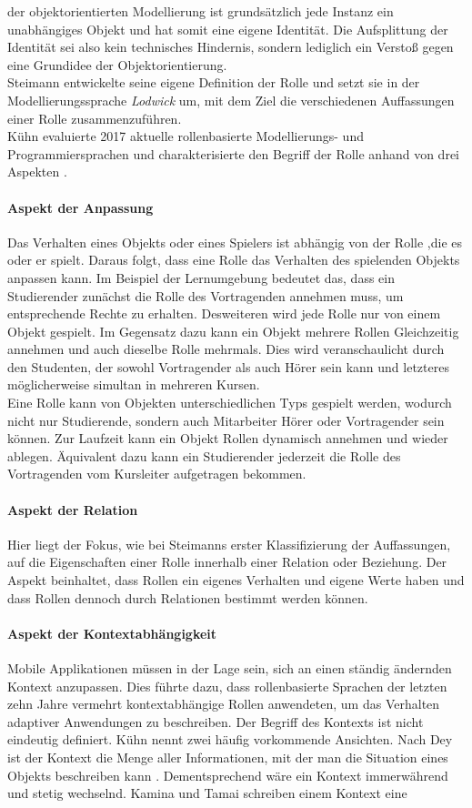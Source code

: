 \documentclass[conference]{IEEEtran}
\begin{document}
der objektorientierten Modellierung ist grundsätzlich jede Instanz ein unabhängiges Objekt und hat somit eine eigene Identität. Die Aufsplittung der Identität sei also kein technisches Hindernis, sondern lediglich ein Verstoß gegen eine Grundidee der Objektorientierung. \\ Steimann entwickelte seine eigene Definition der Rolle und setzt sie in der Modellierungssprache \textit{Lodwick} um, mit dem Ziel die verschiedenen Auffassungen einer Rolle zusammenzuführen. \\Kühn evaluierte 2017 aktuelle rollenbasierte Modellierungs- und Programmiersprachen und charakterisierte den Begriff der Rolle anhand von drei Aspekten \cite{family}. \paragraph{Aspekt der Anpassung} Das Verhalten eines Objekts oder eines Spielers ist abhängig von der Rolle ,die es oder er spielt. Daraus folgt, dass eine Rolle das Verhalten des spielenden Objekts anpassen kann. Im Beispiel der Lernumgebung bedeutet das, dass ein Studierender zunächst die Rolle des Vortragenden annehmen muss, um entsprechende Rechte zu erhalten. Desweiteren wird jede Rolle nur von einem Objekt gespielt. Im Gegensatz dazu kann ein Objekt mehrere Rollen Gleichzeitig annehmen und auch dieselbe Rolle mehrmals. Dies wird veranschaulicht durch den Studenten, der sowohl Vortragender als auch Hörer sein kann und letzteres möglicherweise simultan in mehreren Kursen.\\ Eine Rolle kann von Objekten unterschiedlichen Typs gespielt werden, wodurch nicht nur Studierende, sondern auch Mitarbeiter Hörer oder Vortragender sein können. Zur Laufzeit kann ein Objekt Rollen dynamisch annehmen und wieder ablegen. Äquivalent dazu kann ein Studierender jederzeit die Rolle des Vortragenden vom Kursleiter aufgetragen bekommen.\paragraph{Aspekt der Relation} Hier liegt der Fokus, wie bei Steimanns erster Klassifizierung der Auffassungen, auf die Eigenschaften einer Rolle innerhalb einer Relation oder Beziehung. Der Aspekt beinhaltet, dass Rollen ein eigenes Verhalten und eigene Werte haben und dass Rollen dennoch durch Relationen bestimmt werden können.  \paragraph{Aspekt der Kontextabhängigkeit} Mobile Applikationen müssen in der Lage sein, sich an einen ständig ändernden Kontext anzupassen. Dies führte dazu, dass rollenbasierte Sprachen der letzten zehn Jahre vermehrt kontextabhängige Rollen anwendeten, um das Verhalten adaptiver Anwendungen zu beschreiben. Der Begriff des Kontexts ist nicht eindeutig definiert. Kühn nennt zwei häufig vorkommende Ansichten. Nach Dey ist der Kontext die Menge aller Informationen, mit der man die Situation eines Objekts beschreiben kann \cite{dey2001understanding}. Dementsprechend wäre ein Kontext immerwährend und stetig wechselnd. Kamina und Tamai schreiben einem Kontext eine 
\end{document}
